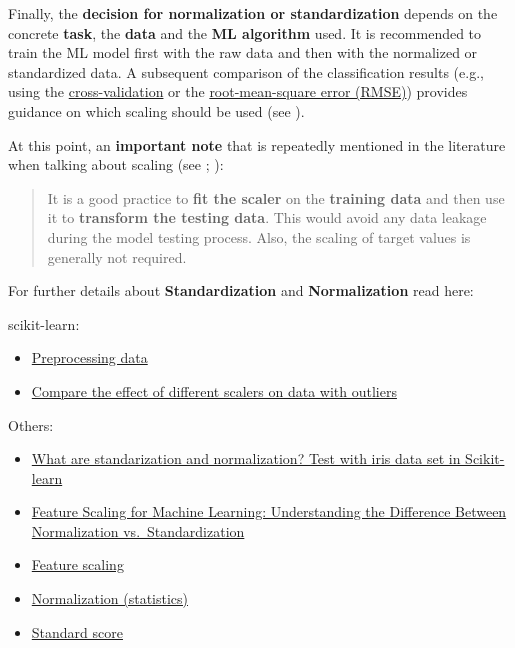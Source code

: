 \documentclass [oneside,10pt,a4paper,ngerman,BCOR10mm,headsepline,parindent,final]{scrartcl}
\providecommand{\tightlist}{%
      \setlength{\itemsep}{0pt}\setlength{\parskip}{0pt}}
\begin{document}
Finally, the \textbf{decision for normalization or standardization}
depends on the concrete \textbf{task}, the \textbf{data} and the
\textbf{ML algorithm} used. It is recommended to train the ML model
first with the raw data and then with the normalized or standardized
data. A subsequent comparison of the classification results (e.g., using
the
\href{https://en.wikipedia.org/wiki/Cross-validation_(statistics)}{cross-validation}
or the
\href{https://en.wikipedia.org/wiki/Root-mean-square_deviation}{root-mean-square
error (RMSE)}) provides guidance on which scaling should be used (see
\cite{feature_scaling_2020}).

At this point, an \textbf{important note} that is repeatedly mentioned
in the literature when talking about scaling (see
\cite{feature_scaling_2020}; \cite{Geron_2018}):

\begin{quote}
It is a good practice to \textbf{fit the scaler} on the \textbf{training
data} and then use it to \textbf{transform the testing data}. This would
avoid any data leakage during the model testing process. Also, the
scaling of target values is generally not required.
\end{quote}

For further details about \textbf{Standardization} and
\textbf{Normalization} read here:

scikit-learn:

\begin{itemize}
\tightlist
\item
  \href{https://scikit-learn.org/stable/modules/preprocessing.html}{Preprocessing
  data}
\item
  \href{https://scikit-learn.org/stable/auto_examples/preprocessing/plot_all_scaling.html\#sphx-glr-auto-examples-preprocessing-plot-all-scaling-py}{Compare
  the effect of different scalers on data with outliers}
\end{itemize}

Others:

\begin{itemize}
\tightlist
\item
  \href{http://techflare.blog/what-are-standarization-and-normalization-test-with-iris-data-set-in-scikit-learn/}{What
  are standarization and normalization? Test with iris data set in
  Scikit-learn}
\item
  \href{https://www.analyticsvidhya.com/blog/2020/04/feature-scaling-machine-learning-normalization-standardization/?}{Feature
  Scaling for Machine Learning: Understanding the Difference Between
  Normalization vs.~Standardization}
\item
  \href{https://en.wikipedia.org/wiki/Feature_scaling}{Feature scaling}
\item
  \href{https://en.wikipedia.org/wiki/Normalization_(statistics)}{Normalization
  (statistics)}
\item
  \href{https://en.wikipedia.org/wiki/Standard_score}{Standard score}
\end{itemize}
\end{document}

